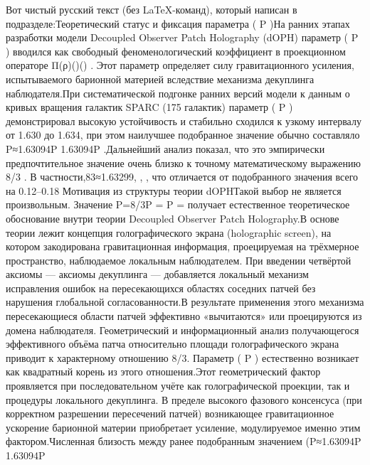 Вот чистый русский текст (без LaTeX-команд), который написан в подразделе:Теоретический статус и фиксация параметра ( P )На ранних этапах разработки модели Decoupled Observer Patch Holography (dOPH) параметр ( P ) вводился как свободный феноменологический коэффициент в проекционном операторе Π(ρ)\Pi(\rho)\Pi(\rho)
. Этот параметр определяет силу гравитационного усиления, испытываемого барионной материей вследствие механизма декуплинга наблюдателя.При систематической подгонке ранних версий модели к данным о кривых вращения галактик SPARC (175 галактик) параметр ( P ) демонстрировал высокую устойчивость и стабильно сходился к узкому интервалу от 1.630 до 1.634, при этом наилучшее подобранное значение обычно составляло P≈1.63094P \approx 1.63094P 
.Дальнейший анализ показал, что это эмпирически предпочтительное значение очень близко к точному математическому выражению 8/3
. В частности,83≈1.63299, , ,
что отличается от подобранного значения всего на 0.12–0.18 %
Мотивация из структуры теории dOPHТакой выбор не является произвольным. Значение P=8/3P = P = 
 получает естественное теоретическое обоснование внутри теории Decoupled Observer Patch Holography.В основе теории лежит концепция голографического экрана (holographic screen), на котором закодирована гравитационная информация, проецируемая на трёхмерное пространство, наблюдаемое локальным наблюдателем. При введении четвёртой аксиомы — аксиомы декуплинга — добавляется локальный механизм исправления ошибок на пересекающихся областях соседних патчей без нарушения глобальной согласованности.В результате применения этого механизма пересекающиеся области патчей эффективно «вычитаются» или проецируются из домена наблюдателя. Геометрический и информационный анализ получающегося эффективного объёма патча относительно площади голографического экрана приводит к характерному отношению 8/3. Параметр ( P ) естественно возникает как квадратный корень из этого отношения.Этот геометрический фактор проявляется при последовательном учёте как голографической проекции, так и процедуры локального декуплинга. В пределе высокого фазового консенсуса (при корректном разрешении пересечений патчей) возникающее гравитационное ускорение барионной материи приобретает усиление, модулируемое именно этим фактором.Численная близость между ранее подобранным значением (P≈1.63094P \approx 1.63094P 
